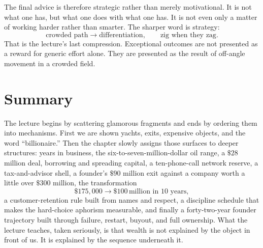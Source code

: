 The final advice is therefore strategic rather than merely motivational. It is not what one has, but what one does with what one has. It is not even only a matter of working harder rather than smarter. The sharper word is strategy:
\begin{equation}
\text{crowded path} \to \text{differentiation},
\qquad
\text{zig when they zag}.
\end{equation}
That is the lecture's last compression. Exceptional outcomes are not presented as a reward for generic effort alone. They are presented as the result of off-angle movement in a crowded field.

\section{Summary}

The lecture begins by scattering glamorous fragments and ends by ordering them into mechanisms. First we are shown yachts, exits, expensive objects, and the word ``billionaire.'' Then the chapter slowly assigns those surfaces to deeper structures: years in business, the six-to-seven-million-dollar oil range, a \(\$28\) million deal, borrowing and spreading capital, a ten-phone-call network reserve, a tax-and-advisor shell, a founder's \(\$90\) million exit against a company worth a little over \(\$300\) million, the transformation
\[
\$175{,}000 \to \$100\,\text{million in 10 years},
\]
a customer-retention rule built from names and respect, a discipline schedule that makes the hard-choice aphorism measurable, and finally a forty-two-year founder trajectory built through failure, restart, buyout, and full ownership. What the lecture teaches, taken seriously, is that wealth is not explained by the object in front of us. It is explained by the sequence underneath it.